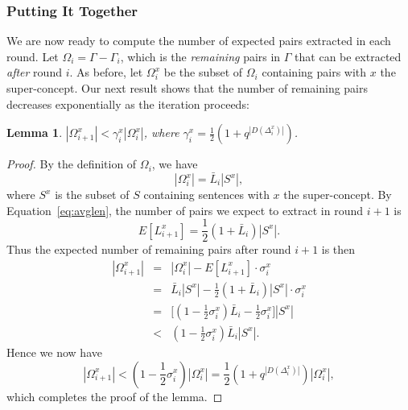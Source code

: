 \documentclass[10pt,journal,cspaper,compsoc]{IEEEtran}
\newtheorem{lemma}{Lemma}
\begin{document}
\subsubsection{Putting It Together}

We are now ready to compute the number of expected pairs extracted in each round.
Let $\Omega_i=\Gamma-\Gamma_i$, which is the \emph{remaining} pairs in $\Gamma$ that can be extracted \emph{after} round $i$. As before, let $\Omega_i^x$ be the subset of $\Omega_i$ containing pairs with $x$ the super-concept. Our next result shows that the number of remaining pairs decreases exponentially as the iteration proceeds:

\begin{lemma}\label{lemma:Omega}
$|\Omega_{i+1}^x|<\gamma_i^x|\Omega_i^x|$, where $\gamma_i^x=\frac{1}{2}(1+q^{|D(\Delta_i^x)|})$.
\end{lemma}

\begin{proof}
By the definition of $\Omega_i$, we have 
\begin{equation}
|\Omega_i^x|=\bar{L}_i|S^x|,
\end{equation}
where $S^x$ is the subset of $S$ containing sentences with $x$ the super-concept. 
By Equation~\ref{eq:avglen}, the number of pairs we expect to extract in round $i+1$ is 
\begin{equation}
E[L_{i+1}^x]=\frac{1}{2}(1+\bar{L}_i)|S^x|. 
\end{equation}
Thus the expected number of remaining pairs after round $i+1$ is then
\begin{eqnarray}\label{eq:omegax}
|\Omega_{i+1}^x|&=&|\Omega_i^x|-E[L_{i+1}^x]\cdot\sigma_i^x\\\nonumber
&=&\bar{L}_i|S^x|-\frac{1}{2}(1+\bar{L}_i)|S^x|\cdot\sigma_i^x\\\nonumber
&=&\big[(1-\frac{1}{2}\sigma_i^x)\bar{L}_i-\frac{1}{2}\sigma_i^x\big]|S^x|\\\nonumber
&<&(1-\frac{1}{2}\sigma_i^x)\bar{L}_i|S^x|.
\end{eqnarray}
Hence we now have
\begin{equation}
|\Omega_{i+1}^x|<(1-\frac{1}{2}\sigma_i^x)|\Omega_i^x|=\frac{1}{2}(1+q^{|D(\Delta_i^x)|})|\Omega_i^x|,
\end{equation}
which completes the proof of the lemma.
\end{proof}
\end{document}
